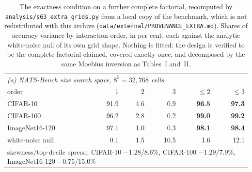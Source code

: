 \begin{table}[!htb]
\centering
\caption{The exactness condition on a further complete factorial, recomputed by \texttt{analysis/s63\_extra\_grids.py} from a local copy of the benchmark, which is not redistributed with this archive (\texttt{data/external/PROVENANCE\_EXTRA.md}). Shares of accuracy variance by interaction order, in per cent, each against the analytic white-noise null of its own grid shape. Nothing is fitted: the design is verified to be the complete factorial claimed, covered exactly once, and decomposed by the same Moebius inversion as Tables~I and~II.}
\label{tab:extra}
\footnotesize
\setlength{\tabcolsep}{3.0pt}
\begin{tabular}{l rrrrr}
\toprule
\multicolumn{6}{l}{\emph{(a) NATS-Bench size search space, $8^{5}=32{,}768$ cells}} \\
order & 1 & 2 & 3 & $\le 2$ & $\le 3$ \\
\midrule
CIFAR-10 & 91.9 & 4.6 & 0.9 & \textbf{96.5} & \textbf{97.3} \\
CIFAR-100 & 96.2 & 2.8 & 0.2 & \textbf{99.0} & \textbf{99.2} \\
ImageNet16-120 & 97.1 & 1.0 & 0.3 & \textbf{98.1} & \textbf{98.4} \\
white-noise null & 0.1 & 1.5 & 10.5 & 1.6 & 12.1 \\
\multicolumn{6}{l}{\quad\footnotesize skewness/top-decile spread: CIFAR-10 $-1.28$/8.6\%, CIFAR-100 $-1.29$/7.9\%, ImageNet16-120 $-0.75$/15.0\%} \\
\bottomrule
\end{tabular}
\end{table}
